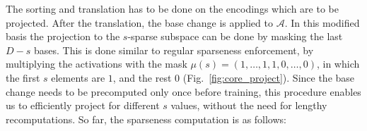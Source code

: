 			The sorting and translation has to be done on the encodings which are to be projected.
			After the translation, the base change is applied to $\mathcal{A}$.
			In this modified basis the projection to the $s$-sparse subspace can be done by masking the last $D-s$ bases.
			This is done similar to regular sparseness enforcement, by multiplying the activations with the mask $\mu(s) = (1,\dots,1,1,0,\dots,0)$, in which the first $s$ elements are $1$, and the rest $0$ (Fig.~\ref{fig:core_project}).
			Since the base change needs to be precomputed only once before training, this procedure enables us to efficiently project for different $s$ values, without the need for lengthy recomputations.
			So far, the sparseness computation is as follows:
			
			
